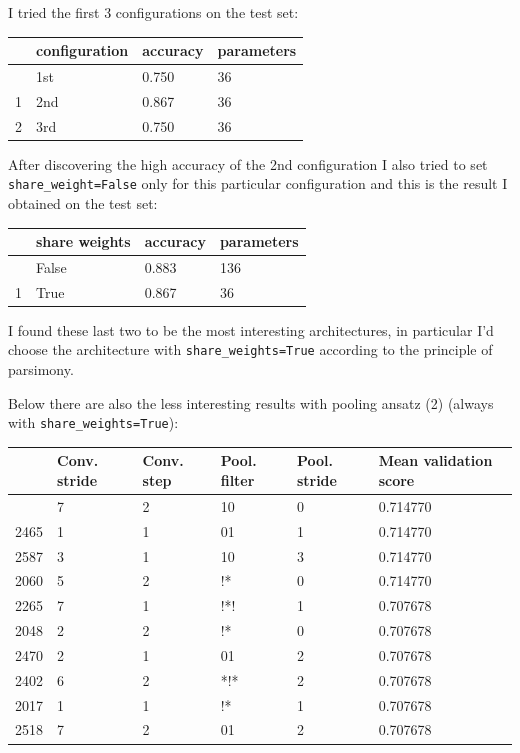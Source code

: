 \documentclass[
  13pt,
  a4paper,
  DIV=11,
  numbers=noendperiod]{scrreprt}
\begin{document}
I tried the first 3 configurations on the test set:

\begin{longtable}[]{@{}llll@{}}
\toprule\noalign{}
& configuration & accuracy & parameters \\
\midrule\noalign{}
\endhead
\bottomrule\noalign{}
\endlastfoot
0 & 1st & 0.750 & 36 \\
1 & 2nd & 0.867 & 36 \\
2 & 3rd & 0.750 & 36 \\
\end{longtable}

After discovering the high accuracy of the 2nd configuration I also
tried to set \texttt{share\_weight=False} only for this particular
configuration and this is the result I obtained on the test set:

\begin{longtable}[]{@{}llll@{}}
\toprule\noalign{}
& share weights & accuracy & parameters \\
\midrule\noalign{}
\endhead
\bottomrule\noalign{}
\endlastfoot
0 & False & 0.883 & 136 \\
1 & True & 0.867 & 36 \\
\end{longtable}

I found these last two to be the most interesting architectures, in
particular I'd choose the architecture with \texttt{share\_weights=True}
according to the principle of parsimony.

Below there are also the less interesting results with pooling ansatz
(2) (always with \texttt{share\_weights=True}):

\begin{longtable}[]{@{}llllll@{}}
\toprule\noalign{}
& Conv. stride & Conv. step & Pool. filter & Pool. stride & Mean
validation score \\
\midrule\noalign{}
\endhead
\bottomrule\noalign{}
\endlastfoot
2628 & 7 & 2 & 10 & 0 & 0.714770 \\
2465 & 1 & 1 & 01 & 1 & 0.714770 \\
2587 & 3 & 1 & 10 & 3 & 0.714770 \\
2060 & 5 & 2 & !* & 0 & 0.714770 \\
2265 & 7 & 1 & !*! & 1 & 0.707678 \\
2048 & 2 & 2 & !* & 0 & 0.707678 \\
2470 & 2 & 1 & 01 & 2 & 0.707678 \\
2402 & 6 & 2 & *!* & 2 & 0.707678 \\
2017 & 1 & 1 & !* & 1 & 0.707678 \\
2518 & 7 & 2 & 01 & 2 & 0.707678 \\
\end{longtable}
\end{document}
